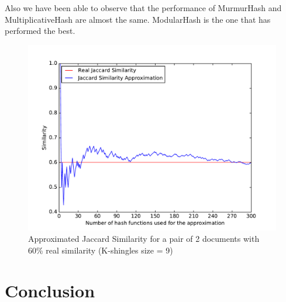 \documentclass[12pt]{article}
\begin{document}
Also we have been able to observe that the performance of MurmurHash and MultiplicativeHash are almost the same. 
ModularHash is the one that has performed the best. 

\begin{figure}[H]
	\centering
	\includegraphics[scale=0.55]{graphs/JaccardSimilarityVsApproximation.pdf}
	\caption{Approximated Jaccard Similarity for a pair of 2 documents with 60\% real similarity (K-shingles size = 9)}
	\label{fig:JaccardVsApprox}
\end{figure}

\clearpage
\section{Conclusion}

\end{document}
